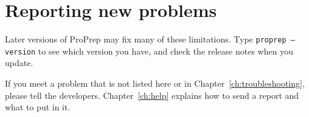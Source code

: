 \section{Reporting new problems}\label{sec:knownissues-report}

Later versions of ProPrep may fix many of these limitations. Type
\texttt{proprep --version} to see which version you have, and check the
release notes when you update.

If you meet a problem that is not listed here or in
Chapter~\ref{ch:troubleshooting}, please tell the developers. Chapter~\ref{ch:help}
explains how to send a report and what to put in it.
